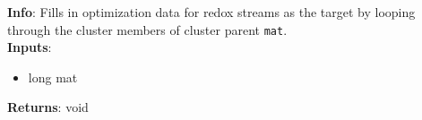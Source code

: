 \textbf{Info}: Fills in optimization data for redox streams as the target by
looping through the cluster members of cluster parent \texttt{mat}. \\

\noindent \textbf{Inputs}:
\begin{itemize}
\item{long mat}
\end{itemize}

\noindent \textbf{Returns}: void
